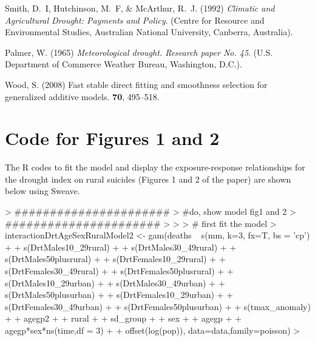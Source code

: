 \documentclass[a4paper]{article}                %
\begin{document}
        \begin{thebibliography}{1}

        Smith, D.~I, Hutchinson, M.~F,  \& McArthur, R.~J.
        \newblock (1992) {\em {Climatic and Agricultural Drought: Payments and
        Policy}}.
        \newblock (Centre for Resource and Environmental Studies, Australian National
        University, Canberra, Australia).

        Palmer, W.
        \newblock (1965) {\em {Meteorological drought. Research paper No. 45}}.
        \newblock (U.S. Department of Commerce Weather Bureau, Washington, D.C.).

        Wood, S.
        \newblock (2008) {Fast stable direct fitting and smoothness selection for
        generalized additive models}.
         {\bf 70}, 495--518.

        \end{thebibliography}



        \clearpage
        \section{Code for Figures 1 and 2}
        The R codes to fit the model and display the exposure-response relationships for the drought index on rural suicides (Figures 1 and 2 of the paper) are shown below using Sweave.

\begin{Schunk}
\begin{Sinput}
> ######################
> #do,  show model fig1 and 2
> ######################
> 
> 
> # first fit the model
>         interactionDrtAgeSexRuralModel2 <- gam(deaths ~  s(mm, k=3, fx=T, bs = 'cp')
+         + s(DrtMales10_29rural)
+         + s(DrtMales30_49rural)
+         + s(DrtMales50plusrural)
+         + s(DrtFemales10_29rural)
+         + s(DrtFemales30_49rural)
+         + s(DrtFemales50plusrural)
+         + s(DrtMales10_29urban)
+         + s(DrtMales30_49urban)
+         + s(DrtMales50plusurban)
+         + s(DrtFemales10_29urban)
+         + s(DrtFemales30_49urban)
+         + s(DrtFemales50plusurban)
+         + s(tmax_anomaly)
+         + agegp2
+         + rural
+         + sd_group
+         + sex
+         + agegp
+         + agegp*sex*ns(time,df = 3)
+         + offset(log(pop)), data=data,family=poisson)
> 
\end{Sinput}
\end{Schunk}
\end{document}
